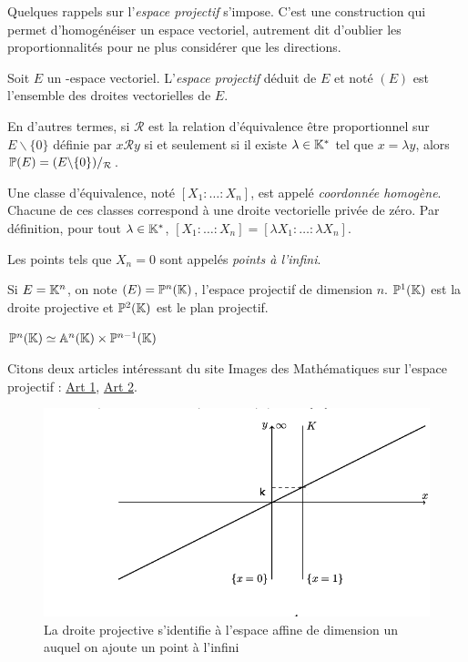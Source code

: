 \vspace{0.5cm}
Quelques rappels sur l'\emph{espace projectif} s'impose. C'est une construction qui permet d'homogénéiser un espace vectoriel, autrement dit d'oublier les proportionnalités pour ne plus considérer que les directions.
\begin{definition}
Soit $E$ un \field{}-espace vectoriel. L'\emph{espace projectif} déduit de $E$ et noté $(E)$  est l'ensemble des droites vectorielles de $E$.

En d'autres termes, si $\mathcal{R}$ est la relation d'équivalence \og être proportionnel \fg{} sur $E\backslash \{0\}$ définie par $x\mathcal{R}y$ si et seulement si il existe $\lambda \in \mathbb{K}{}^*$ tel que $x = \lambda y$, alors $\mathbb{P}(E) = (E \backslash \{0\}) /_{\mathcal{R}}$.

Une classe d'équivalence, noté $[X_1 : \ldots : X_n]$, est appelé \emph{coordonnée homogène}. Chacune de ces classes correspond à une droite vectorielle privée de zéro. Par définition, pour tout $\lambda \in \mathbb{K}{}^*$, $[X_1 : \ldots : X_n] = [\lambda X_1 : \ldots : \lambda X_n]$.

Les points tels que $X_n = 0$ sont appelés \emph{points à l'infini}.

Si $E = \mathbb{K}{}^n$, on note $(E) = \mathbb{P}^n(\mathbb{K}{})$, l'espace projectif de dimension $n$. $\mathbb{P}^1(\mathbb{K}{})$ est la droite projective et $\mathbb{P}^2(\mathbb{K}{})$ est le plan projectif.

$\mathbb{P}^n(\mathbb{K}{}) \simeq \mathbb{A}^n(\mathbb{K}{}) \times \mathbb{P}^{n-1}(\mathbb{K}{})$
\end{definition}

Citons deux articles intéressant du site Images des Mathématiques sur l'espace projectif : \href{http://images.math.cnrs.fr/L-infini-est-une-droite-comme-les.html}{Art 1}, \href{http://images.math.cnrs.fr/Et-si-on-rajoutait-une-droite-a-l.html}{Art 2}.

\begin{figure}[ht]
    \centering
    \includegraphics[scale=0.4]{images/projectif.png}
    \caption{La droite projective s'identifie à l'espace affine de dimension un auquel on ajoute un point à l'infini}
    \label{fig:projectif}
\end{figure}


